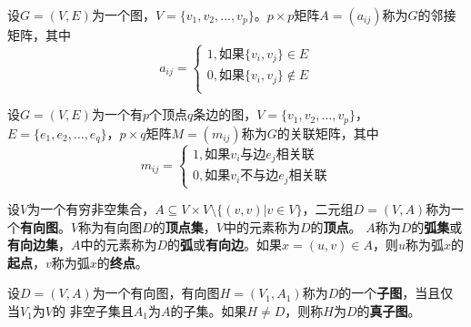 \documentclass{beamer}
\begin{document}
\begin{CJK*}{UTF8}{gbsn}
\begin{frame}
  \begin{Def}
  设$G=(V,E)$为一个图，$V=\{v_1,v_2,\ldots,v_p\}$。$p\times p$矩阵$A=(a_{ij})$称为$G$的邻接矩阵，其中
  \[a_{ij}=\begin{cases}
      1, \text{如果}\{v_i,v_j\}\in E\\
      0, \text{如果}\{v_i,v_j\}\notin E\\
    \end{cases}
  \]
\end{Def}
 \begin{Def}
   设$G=(V,E)$为一个有$p$个顶点$q$条边的图，$V=\{v_1,v_2,\ldots, v_p\}$，$E=\{e_1,e_2,\ldots,e_q\}$，$p\times q$矩阵$M=(m_{ij})$称为$G$的关联矩阵，其中
  \[m_{ij}=\begin{cases}
      1, \text{如果}v_i\text{与边}e_j\text{相关联}\\
      0, \text{如果}v_i\text{不与边}e_j\text{相关联}
    \end{cases}
  \]
 \end{Def}

\end{frame}
\begin{frame}
    \begin{Def}
    设$V$为一个有穷非空集合，$A \subseteq V\times V \setminus \{(v,v)|v \in V\}$，二元组$D=(V,A)$称为一个{\bfseries 有向图}。$V$称为有向图$D$的{\bfseries 顶点集}，$V$中的元素称为$D$的{\bfseries 顶点}。
    $A$称为$D$的{\bfseries 弧集}或{\bfseries 有向边集}，$A$中的元素称为$D$的{\bfseries 弧}或{\bfseries 有向边}。如果$x = (u,v) \in A$，则$u$称为弧$x$的{\bfseries 起点}，$v$称为弧$x$的{\bfseries 终点}。
  \end{Def}
    \centering
\end{frame}
\begin{frame}
    \begin{Def}
    设$D=(V,A)$为一个有向图，有向图$H=(V_1,A_1)$称为$D$的一个{\bfseries 子图}，当且仅当$V_1$为$V$的
    非空子集且$A_1$为$A$的子集。如果$H \neq D$，则称$H$为$D$的{\bfseries 真子图}。
  \end{Def}
  

\end{frame}
\end{CJK*}
\end{document}
